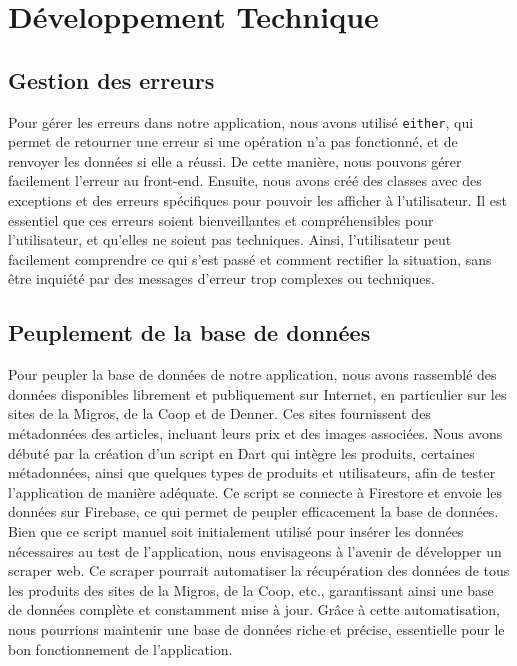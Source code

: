 \section{Développement Technique}

\subsection{Gestion des erreurs}
\label{sec:error_handling}

Pour gérer les erreurs dans notre application, nous avons utilisé \texttt{either}, qui permet de retourner une erreur si une opération n'a pas fonctionné, et de renvoyer les données si elle a réussi. De cette manière, nous pouvons gérer facilement l'erreur au front-end. Ensuite, nous avons créé des classes avec des exceptions et des erreurs spécifiques pour pouvoir les afficher à l'utilisateur. Il est essentiel que ces erreurs soient bienveillantes et compréhensibles pour l'utilisateur, et qu'elles ne soient pas techniques. Ainsi, l'utilisateur peut facilement comprendre ce qui s'est passé et comment rectifier la situation, sans être inquiété par des messages d'erreur trop complexes ou techniques.


\subsection{Peuplement de la base de données}

Pour peupler la base de données de notre application, nous avons rassemblé des données disponibles librement et publiquement sur Internet, en particulier sur les sites de la Migros, de la Coop et de Denner. Ces sites fournissent des métadonnées des articles, incluant leurs prix et des images associées. Nous avons débuté par la création d'un script en Dart qui intègre les produits, certaines métadonnées, ainsi que quelques types de produits et utilisateurs, afin de tester l'application de manière adéquate. Ce script se connecte à Firestore et envoie les données sur Firebase, ce qui permet de peupler efficacement la base de données. Bien que ce script manuel soit initialement utilisé pour insérer les données nécessaires au test de l'application, nous envisageons à l'avenir de développer un scraper web. Ce scraper pourrait automatiser la récupération des données de tous les produits des sites de la Migros, de la Coop, etc., garantissant ainsi une base de données complète et constamment mise à jour. Grâce à cette automatisation, nous pourrions maintenir une base de données riche et précise, essentielle pour le bon fonctionnement de l'application.

